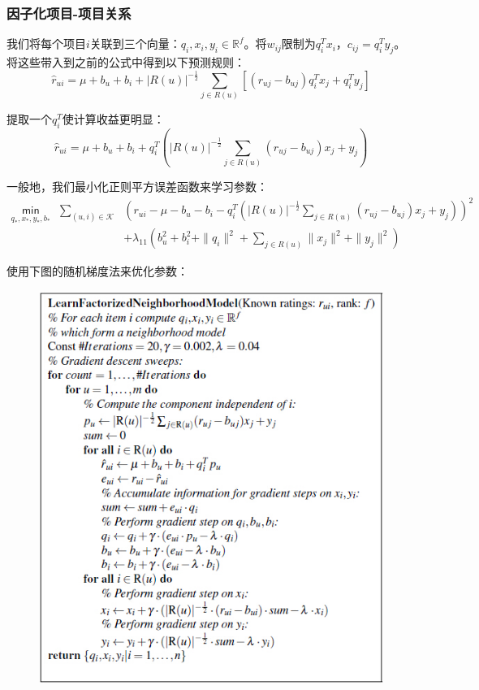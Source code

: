 \documentclass{article}
\begin{document}
\subsubsection{因子化项目-项目关系}
我们将每个项目$i$关联到三个向量：$q_i,x_i,y_i\in\mathbb{R}^f$。将$w_{ij}$限制为$q_i^Tx_i$，$c_{ij}=q_i^Ty_j$。将这些带入到之前的公式中得到以下预测规则：
$$ \hat{r}_{ui}=\mu+b_u+b_i+|R(u)|^{-\frac{1}{2}}\mathop{\sum}\limits_{j\in R(u)}[(r_{uj}-b_{uj})q_i^Tx_j+q_i^Ty_j] $$

提取一个$q_i^T$使计算收益更明显：
$$ \hat{r}_{ui}=\mu+b_u+b_i+q_i^T\left(|R(u)|^{-\frac{1}{2}}\mathop{\sum}\limits_{j\in R(u)}(r_{uj}-b_{uj})x_j+y_j\right) $$

一般地，我们最小化正则平方误差函数来学习参数：
\[ 
\begin{array}{ccl}
\mathop{\mathsf{min}}\limits_{q_*,x_*,y_*,b_*} & \mathop{\sum}\limits_{(u,i)\in\mathcal{K}} & \left(r_{ui}-\mu-b_u-b_i-q_i^T\left(|R(u)|^{-\frac{1}{2}}\mathop{\sum}\limits_{j\in R(u)}(r_{uj}-b_{uj})x_j+y_j\right)\right)^2\\
& & +\lambda_{11}\left(b_u^2+b_i^2+\|q_i\|^2+\mathop{\sum}\limits_{j\in R(u)}\|x_j\|^2+\|y_j\|^2\right) 
\end{array}
\]

使用下图的随机梯度法来优化参数：
\begin{figure}[htb]
	\centering
	\includegraphics[scale=0.6]{f3.jpg}
\end{figure}
\end{document}
